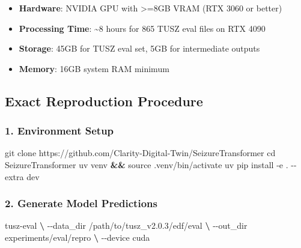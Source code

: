 \documentclass[
]{article}
\newenvironment{Shaded}{}{}
\newcommand{\BuiltInTok}[1]{#1}
\newcommand{\ExtensionTok}[1]{#1}
\newcommand{\FunctionTok}[1]{\textcolor[rgb]{0.02,0.16,0.49}{#1}}
\newcommand{\KeywordTok}[1]{\textcolor[rgb]{0.00,0.44,0.13}{\textbf{#1}}}
\newcommand{\NormalTok}[1]{#1}
\providecommand{\tightlist}{%
  \setlength{\itemsep}{0pt}\setlength{\parskip}{0pt}}
\begin{document}
\begin{itemize}
\tightlist
\item
  \textbf{Hardware}: NVIDIA GPU with \textgreater=8GB VRAM (RTX 3060 or
  better)
\item
  \textbf{Processing Time}: \textasciitilde8 hours for 865 TUSZ eval
  files on RTX 4090
\item
  \textbf{Storage}: 45GB for TUSZ eval set, 5GB for intermediate outputs
\item
  \textbf{Memory}: 16GB system RAM minimum
\end{itemize}

\hypertarget{exact-reproduction-procedure}{%
\subsection{Exact Reproduction
Procedure}\label{exact-reproduction-procedure}}

\hypertarget{environment-setup}{%
\subsubsection{1. Environment Setup}\label{environment-setup}}

\begin{Shaded}
\begin{Highlighting}[]
\FunctionTok{git}\NormalTok{ clone https://github.com/Clarity{-}Digital{-}Twin/SeizureTransformer}
\BuiltInTok{cd}\NormalTok{ SeizureTransformer}
\ExtensionTok{uv}\NormalTok{ venv }\KeywordTok{\&\&} \BuiltInTok{source}\NormalTok{ .venv/bin/activate}
\ExtensionTok{uv}\NormalTok{ pip install {-}e . {-}{-}extra dev}
\end{Highlighting}
\end{Shaded}

\hypertarget{generate-model-predictions}{%
\subsubsection{2. Generate Model
Predictions}\label{generate-model-predictions}}

\begin{Shaded}
\begin{Highlighting}[]
\ExtensionTok{tusz{-}eval} \KeywordTok{\textbackslash{}}
  \ExtensionTok{{-}{-}data\_dir}\NormalTok{ /path/to/tusz\_v2.0.3/edf/eval }\KeywordTok{\textbackslash{}}
  \ExtensionTok{{-}{-}out\_dir}\NormalTok{ experiments/eval/repro }\KeywordTok{\textbackslash{}}
  \ExtensionTok{{-}{-}device}\NormalTok{ cuda}
\end{Highlighting}
\end{Shaded}
\end{document}
